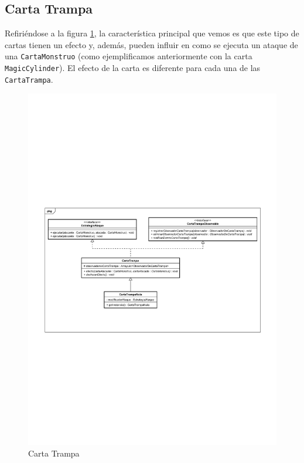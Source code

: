 	
	\subsection{Carta Trampa}
	
	Refiriéndose a la figura \ref{class_Carta_Trampa}, la característica principal que vemos es que este tipo de cartas tienen un efecto y, además, pueden influir en como se ejecuta un ataque de una \texttt{CartaMonstruo} (como ejemplificamos anteriormente con la carta \texttt{MagicCylinder}). El efecto de la carta es diferente para cada una de las \texttt{CartaTrampa}.
	
	\begin{figure}[H]
		\centering
		\includegraphics[scale=0.8]{includes/class_CartaTrampa}
		\caption{Carta Trampa}
		\label{class_Carta_Trampa}
	\end{figure}
	
